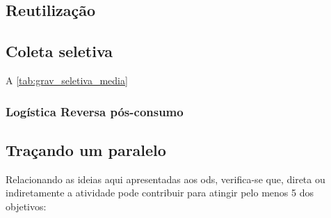 \subsection{Reutilização}

\subsection{Coleta seletiva}

A \autoref{tab:grav_seletiva_media}

	

\subsubsection{Logística Reversa pós-consumo}

\subsection{Traçando um paralelo}
Relacionando as ideias aqui apresentadas aos \gls{ods}, verifica-se que, direta ou indiretamente a atividade pode contribuir para atingir pelo menos 5 dos objetivos:

